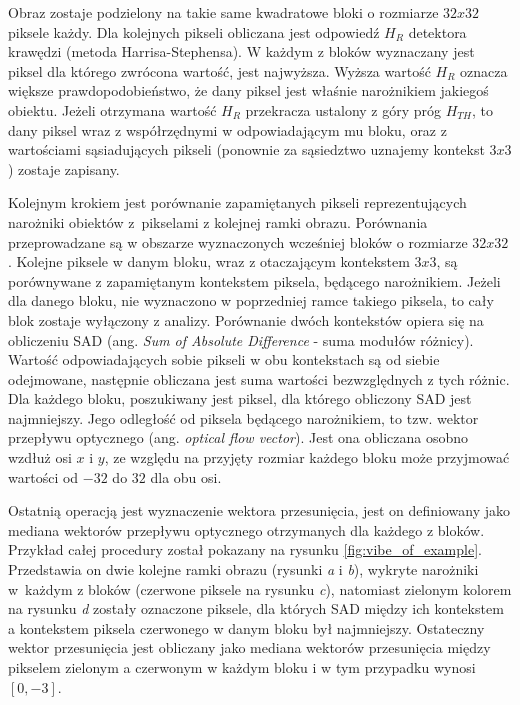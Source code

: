Obraz zostaje podzielony na takie same kwadratowe bloki o rozmiarze $32x32$ piksele każdy. Dla kolejnych pikseli obliczana jest odpowiedź $H_R$ detektora krawędzi (metoda Harrisa-Stephensa). W każdym z bloków wyznaczany jest piksel dla którego zwrócona wartość, jest najwyższa. Wyższa wartość $H_R$ oznacza większe prawdopodobieństwo, że dany piksel jest właśnie narożnikiem jakiegoś obiektu. Jeżeli otrzymana wartość $H_R$ przekracza ustalony z góry próg $H_{TH}$, to dany piksel wraz z współrzędnymi w odpowiadającym mu bloku, oraz z wartościami sąsiadujących pikseli (ponownie za sąsiedztwo uznajemy kontekst $3x3$) zostaje zapisany.

Kolejnym krokiem jest porównanie zapamiętanych pikseli reprezentujących narożniki obiektów z~pikselami z kolejnej ramki obrazu. Porównania przeprowadzane są w obszarze wyznaczonych wcześniej bloków o rozmiarze $32x32$. Kolejne piksele w danym bloku, wraz z otaczającym kontekstem $3x3$, są porównywane z zapamiętanym kontekstem piksela, będącego narożnikiem. Jeżeli dla danego bloku, nie wyznaczono w poprzedniej ramce takiego piksela, to cały blok zostaje wyłączony z analizy. Porównanie dwóch kontekstów opiera się na obliczeniu SAD (ang. \textit{Sum of Absolute Difference} - suma modułów różnicy). Wartość odpowiadających sobie pikseli w obu kontekstach są od siebie odejmowane, następnie obliczana jest suma wartości bezwzględnych z tych różnic. Dla każdego bloku, poszukiwany jest piksel, dla którego obliczony SAD jest najmniejszy. Jego odległość od piksela będącego narożnikiem, to tzw. wektor przepływu optycznego (ang. \textit{optical flow vector}). Jest ona obliczana osobno wzdłuż osi $x$ i $y$, ze względu na przyjęty rozmiar każdego bloku może przyjmować wartości od $-32$ do $32$ dla obu osi.

Ostatnią operacją jest wyznaczenie wektora przesunięcia, jest on definiowany jako mediana wektorów przepływu optycznego otrzymanych dla każdego z bloków. Przykład całej procedury został pokazany na rysunku \ref{fig:vibe_of_example}. Przedstawia on dwie kolejne ramki obrazu (rysunki \textit{a} i \textit{b}), wykryte narożniki w~każdym z bloków (czerwone piksele na rysunku \textit{c}), natomiast zielonym kolorem na rysunku \textit{d} zostały oznaczone piksele, dla których SAD między ich kontekstem a kontekstem piksela czerwonego w danym bloku był najmniejszy. Ostateczny wektor przesunięcia jest obliczany jako mediana wektorów przesunięcia między pikselem zielonym a czerwonym w każdym bloku i w tym przypadku wynosi $[0,-3]$.

